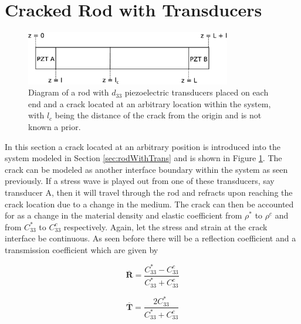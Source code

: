 
\section{Cracked Rod with Transducers}
\label{sec:rodTransCrack}

\begin{figure}[ht!]
\centering
\includegraphics[width=0.8\textwidth]{eps_pics/rodTransCrack.eps}
\caption{Diagram of a rod with $d_{33}$ piezoelectric transducers placed on each end and a crack located at an arbitrary location within the system, with $l_c$ being the distance of the crack from the origin and is not known a prior.
	 \label{fig:rodTransCrack}} 
\end{figure}


In this section a crack located at an arbitrary position is introduced into the system modeled in Section \ref{sec:rodWithTrans} and is shown in Figure \ref{fig:rodTransCrack}. The crack can be modeled as another interface boundary within the system as seen previously. If a stress wave is played out from one of these transducers, say transducer A, then it will travel through the rod and refracts upon reaching the crack location due to a change in the medium. The crack can then be accounted for as a change in the material density and elastic coefficient from $\rho ^*$ to $\rho ^c$ and from $C^*_{33}$ to $C^c_{33}$ respectively. Again, let the stress and strain at the crack interface be continuous. As seen before there will be a reflection coefficient and a transmission coefficient which are given by

\begin{equation}
\boldsymbol{\overline{R}} = \frac{C^*_{33} - C^c_{33}}{C^*_{33} + C^c_{33}}
\end{equation}

\begin{equation}
\boldsymbol{\overline{T}} = \frac{2C^*_{33}}{C^*_{33} + C^c_{33}}
\end{equation}



